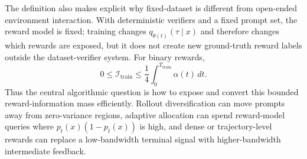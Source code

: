 The definition also makes explicit why fixed-dataset \llm{} \rlvr{} is different from open-ended environment interaction. With deterministic verifiers and a fixed prompt set, the reward model is fixed; training changes $q_{\theta(t)}(\tau\mid x)$ and therefore changes which rewards are exposed, but it does not create new ground-truth reward labels outside the dataset-verifier system. For binary rewards,
\[
  0
  \le
  \mathcal{I}_{\mathrm{train}}
  \le
  \frac{1}{4}\int_0^{T_{\mathrm{train}}} \alpha(t)\,dt.
\]
Thus the central algorithmic question is how to expose and convert this bounded reward-information mass efficiently. Rollout diversification can move prompts away from zero-variance regions, adaptive allocation can spend reward-model queries where $p_t(x)(1-p_t(x))$ is high, and dense or trajectory-level rewards can replace a low-bandwidth terminal signal with higher-bandwidth intermediate feedback.
